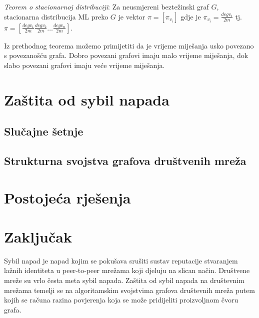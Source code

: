 \documentclass[times, utf8, seminar, numeric]{fer}
\begin{document}
\textit{Teorem o stacionarnoj distribuciji}: Za neusmjereni beztežinski graf $G$, stacionarna distribucija ML preko $G$ je vektor $\pi = [\pi_{v_i}]$ gdje je $\pi_{v_i} = \frac{deg v_i}{2 m}$ tj. $\pi = [\frac{deg v_1}{2 m} \frac{deg v_2}{2 m} \dots \frac{deg v_n}{2 m}]$. \cite{friends}

Iz prethodnog teorema možemo primijetiti da je vrijeme miješanja usko povezano s povezanošću grafa. Dobro povezani grafovi imaju malo vrijeme miješanja, dok slabo povezani grafovi imaju veće vrijeme miješanja.

\chapter{Zaštita od sybil napada}

\section{Slučajne šetnje}

\section{Strukturna svojstva grafova društvenih mreža}

\chapter{Postojeća rješenja}

\chapter{Zaključak}




\begin{sazetak}
  Sybil napad je napad kojim se pokušava srušiti sustav reputacije stvaranjem lažnih identiteta u peer-to-peer mrežama koji djeluju na slican način. Društvene mreže su vrlo česta meta sybil napada. Zaštita od sybil napada na društevnim mrežama temelji se na algoritamskim svojstvima grafova društevnih mreža putem kojih se računa razina povjerenja koja se može pridijeliti proizvoljnom čvoru grafa.

\end{sazetak}
\end{document}
